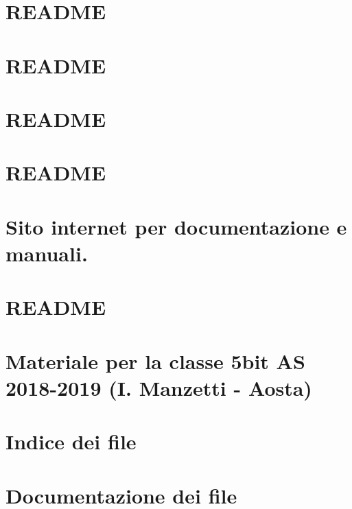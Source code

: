 \documentclass[twoside]{book}
\newcommand{\+}{\discretionary{\mbox{\scriptsize$\hookleftarrow$}}{}{}}
\newcommand{\clearemptydoublepage}{%
  \newpage{\pagestyle{empty}\cleardoublepage}%
}
\begin{document}
\chapter{R\+E\+A\+D\+ME}
\label{md_manuali_sito_etc_README}

\chapter{R\+E\+A\+D\+ME}
\label{md_manuali_sito_images_README}

\chapter{R\+E\+A\+D\+ME}
\label{md_manuali_sito_js_README}

\chapter{R\+E\+A\+D\+ME}
\label{md_manuali_sito_lib_README}

\chapter{Sito internet per documentazione e manuali.}
\label{md_manuali_sito_README}

\chapter{R\+E\+A\+D\+ME}
\label{md_manuali_sito_sub_README}

\chapter{Materiale per la classe 5bit AS 2018-\/2019 (I. Manzetti -\/ Aosta)}
\label{md_README}

\chapter{Indice dei file}

\chapter{Documentazione dei file}

















\backmatter
\newpage
{}
\clearemptydoublepage
{}
\printindex
\end{document}
